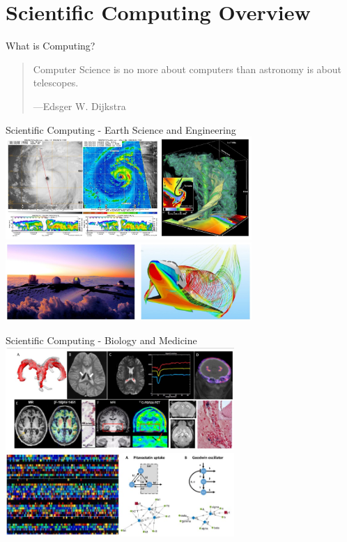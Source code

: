 \documentclass[aspectratio=169]{beamer}
\begin{document}
\section{Scientific Computing Overview}

\begin{frame}{What is Computing?}

    \begin{quote}
        Computer Science is no more about computers than astronomy is about telescopes.
        \begin{flushleft}
            ---Edsger W. Dijkstra
        \end{flushleft}
    \end{quote}

\end{frame}

\begin{frame}{Scientific Computing - Earth Science and Engineering}
    \centering
    \includegraphics[width=0.7\textwidth]{imgs/vis_0.jpg}
    \includegraphics[width=0.7\textwidth]{imgs/vis_1.jpg}
\end{frame}

\begin{frame}{Scientific Computing - Biology and Medicine}
    \centering
    \includegraphics[width=0.65\textwidth]{imgs/vis_2.jpg}
    \includegraphics[width=0.65\textwidth]{imgs/vis_3.jpg}
\end{frame}
\end{document}
